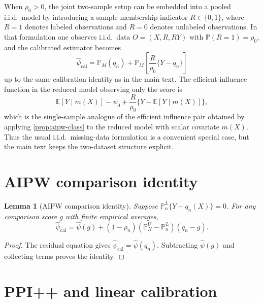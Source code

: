 \documentclass{article}
\theoremstyle{plain}
\newtheorem{lemma}{Lemma}
\theoremstyle{definition}
\newcommand{\E}{\mathbb{E}}
\newcommand{\Prob}{\mathbb{P}}
\newcommand{\1}{\mathbf{1}}
\newcommand{\psihat}{\widehat{\psi}_{\mathrm{cal}}}
\newcommand{\mhat}{m}
\newcommand{\rhozero}{\rho_0}
\newcommand{\rhon}{\rho_n}
\newcommand{\mtilde}{q_n}
\newcommand{\Pl}{\mathbb{P}^{L}_n}
\newcommand{\Pu}{\mathbb{P}^{U}_N}
\begin{document}
When \(\rhozero>0\), the joint two-sample setup can be embedded into a pooled i.i.d.\ model by introducing a sample-membership indicator \(R \in \{0,1\}\), where \(R=1\) denotes labeled observations and \(R=0\) denotes unlabeled observations. In that formulation one observes i.i.d.\ data \(O=(X,R,RY)\) with \(\Prob(R=1)=\rhozero\), and the calibrated estimator becomes
\[
\psihat = \mathbb P_M(\mtilde) + \mathbb P_M\left[\frac{R}{\rhozero}\{Y-\mtilde\}\right]
\]
up to the same calibration identity as in the main text. The efficient influence function in the reduced model observing only the score is
\[
\E[Y\mid m(X)]-\psi_0
+\frac{R}{\rhozero}\{Y-\E[Y\mid m(X)]\},
\]
which is the single-sample analogue of the efficient influence pair obtained by applying \cref{prop:aipw-class} to the reduced model with scalar covariate \(\mhat(X)\). Thus the usual i.i.d.\ missing-data formulation is a convenient special case, but the main text keeps the two-dataset structure explicit.

\section{AIPW comparison identity}
\label{app:repr}

\begin{lemma}[AIPW comparison identity]
\label{lem:aipw-comparison}
Suppose \(\Pl\{Y-q_n(X)\}=0\). For any comparison score \(g\) with finite
empirical averages,
\[
\psihat=\widehat\psi(g)+(1-\rhon)(\Pu-\Pl)(q_n-g).
\]
\end{lemma}
\begin{proof}
The residual equation gives \(\psihat=\widehat\psi(q_n)\).
Subtracting \(\widehat\psi(g)\) and collecting terms proves the identity.
\end{proof}

\section{PPI++ and linear calibration}
\label{sec:ppi++}
\end{document}
